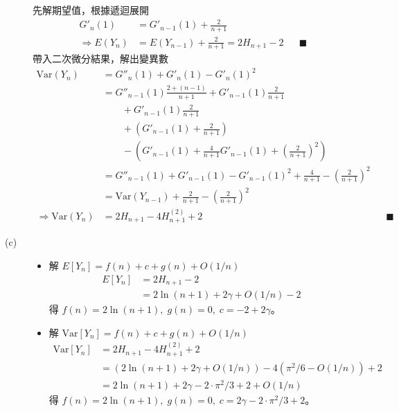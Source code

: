 \documentclass[11pt,fleqn]{article}
\begin{document}
\begin{description}
		先解期望值，根據遞迴展開
		\begin{align*}
			{G}'_n(1) &= {G}'_{n-1}(1) + \frac{2}{n+1} \\
			\Rightarrow
				E(Y_n) &= E(Y_{n-1}) + \frac{2}{n+1} = 2 H_{n+1} - 2 && \blacksquare
		\end{align*}
		帶入二次微分結果，解出變異數
		\begin{align*}
			\text{Var}(Y_n) &= {G}''_n(1) + {G}'_n(1) - {G}'_n(1)^2 \\
			&= {G}''_{n-1}(1) \frac{2 + (n-1)}{n+1} + {G}'_{n-1}(1) \frac{2}{n+1} \\
			& \qquad + {G}'_{n-1}(1)\frac{2}{n+1} \\
			& \qquad + \left( {G}'_{n-1}(1) + \frac{2}{n+1} \right)\\
			& \qquad - \left( {G}'_{n-1}(1) + \frac{4}{n+1} {G}'_{n-1}(1) + \left(\frac{2}{n+1}\right)^2 \right) \\
			&= {G}''_{n-1}(1) + {G}'_{n-1}(1) - {G}'_{n-1}(1)^2 + \frac{4}{n+1} - \left(\frac{2}{n+1}\right)^2 \\
			&= \text{Var}(Y_{n-1}) + \frac{2}{n+1} - \left(\frac{2}{n+1}\right)^2 \\
			\Rightarrow
				\text{Var}(Y_n) &= 2 H_{n+1} - 4 H^{(2)}_{n+1} + 2 && \blacksquare
		\end{align*}
	\item[(c)] 
		\begin{itemize}
			\item 解 $E[Y_n] = f(n) + c + g(n) + O(1/n)$
			\begin{align*}
				E[Y_n] 
				&= 2 H_{n+1} - 2 \\
				&= 2 \ln (n+1) + 2 \gamma + O(1/n) - 2
			\end{align*}
			得 $f(n) = 2\ln (n+1), \; g(n) = 0, \; c = -2 + 2 \gamma$。
			\item 解 $\text{Var}[Y_n] = f(n) + c + g(n) + O(1/n)$
			\begin{align*}
				\text{Var}[Y_n] 
					&= 2 H_{n+1} - 4 H^{(2)}_{n+1} + 2 \\
					&= \left(2 \ln (n+1) + 2 \gamma + O(1/n)\right)
						- 4 \left( \pi^2 / 6 - O(1/n)\right) + 2 \\
					&= 2 \ln (n+1) + 2 \gamma - 2 \cdot \pi^2 / 3 + 2 + O(1/n)
			\end{align*}
			得 $f(n) = 2\ln (n+1), \; g(n) = 0, \; c = 2 \gamma - 2 \cdot \pi^2 / 3 + 2$。
		\end{itemize}
\end{description}
\end{document}
